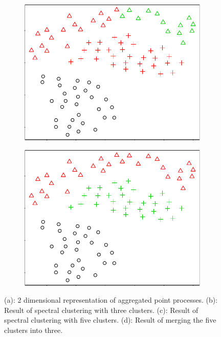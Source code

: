 \begin{figure}[H]
\begin{subfigure}{.49\textwidth}
\includegraphics[width=\textwidth]{../simulation/plots/overclus_b}
\caption{}
\end{subfigure}
\begin{subfigure}{.49\textwidth}
\includegraphics[width=\textwidth]{../simulation/plots/overclus_d}
\caption{}
\end{subfigure}
\caption{(a): 2 dimensional representation of aggregated point processes.
(b): Result of spectral clustering with three clusters.
(c): Result of spectral clustering with five clusters.
(d): Result of merging the five clusters into three. }
\end{figure}











